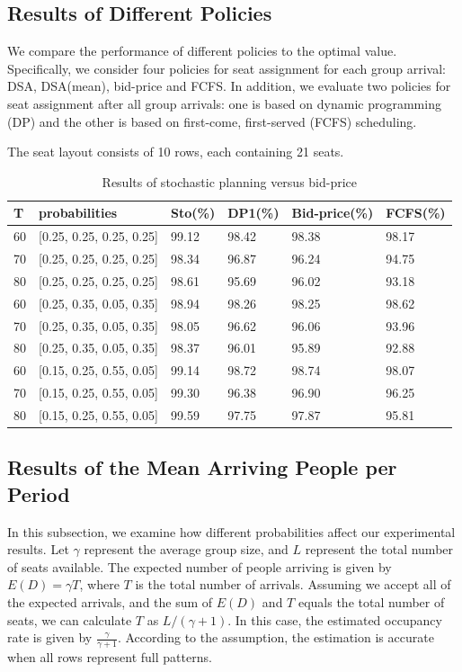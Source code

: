 \subsection{Results of Different Policies}
We compare the performance of different policies to the optimal value. Specifically, we consider four policies for seat assignment for each group arrival: DSA, DSA(mean), bid-price and FCFS. In addition, we evaluate two policies for seat assignment after all group arrivals: one is based on dynamic programming (DP) and the other is based on first-come, first-served (FCFS) scheduling.

The seat layout consists of 10 rows, each containing 21 seats.

\begin{table}[ht]
  \centering
  \caption{Results of stochastic planning versus bid-price}
  \begin{tabular}{|l|l|l|l|l|l|}
  \hline
   T & probabilities & Sto(\%) & DP1(\%) & Bid-price(\%) & FCFS(\%) \\
  \hline
   60  & [0.25, 0.25, 0.25, 0.25]  & 99.12 & 98.42 & 98.38 & 98.17 \\
   70  & [0.25, 0.25, 0.25, 0.25]  & 98.34 & 96.87 & 96.24 & 94.75 \\
   80  & [0.25, 0.25, 0.25, 0.25]  & 98.61 & 95.69 & 96.02 & 93.18 \\
   \hline
   60  & [0.25, 0.35, 0.05, 0.35]  & 98.94 & 98.26 & 98.25 & 98.62 \\
   70  & [0.25, 0.35, 0.05, 0.35]  & 98.05 & 96.62 & 96.06 & 93.96 \\
   80  & [0.25, 0.35, 0.05, 0.35]  & 98.37 & 96.01 & 95.89 & 92.88 \\
  \hline
  60  & [0.15, 0.25, 0.55, 0.05]  & 99.14 & 98.72 & 98.74 & 98.07 \\
  70  & [0.15, 0.25, 0.55, 0.05]  & 99.30 & 96.38 & 96.90 & 96.25 \\
  80  & [0.15, 0.25, 0.55, 0.05]  & 99.59 & 97.75 & 97.87 & 95.81 \\
  \hline
  \end{tabular}
\end{table}



\subsection{Results of the Mean Arriving People per Period}
In this subsection, we examine how different probabilities affect our experimental results. Let $\gamma$ represent the average group size, and $L$ represent the total number of seats available. The expected number of people arriving is given by $E(D) = \gamma T$, where $T$ is the total number of arrivals. Assuming we accept all of the expected arrivals, and the sum of $E(D)$ and $T$ equals the total number of seats, we can calculate $T$ as $L/(\gamma + 1)$. In this case, the estimated occupancy rate is given by $\frac{\gamma}{\gamma+1}$. According to the assumption, the estimation is accurate when all rows represent full patterns.

